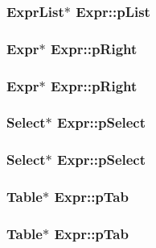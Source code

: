 \subsubsection{\setlength{\rightskip}{0pt plus 5cm}\bf{Expr\-List}$\ast$ \bf{Expr::p\-List}}\label{structExpr_8eb0b59798c61d147a051fbd93a0983c}


\subsubsection{\setlength{\rightskip}{0pt plus 5cm}\bf{Expr}$\ast$ \bf{Expr::p\-Right}}\label{structExpr_c7e7645d9ef0afe58cc8a7b254022cb1}


\subsubsection{\setlength{\rightskip}{0pt plus 5cm}\bf{Expr}$\ast$ \bf{Expr::p\-Right}}\label{structExpr_c7e7645d9ef0afe58cc8a7b254022cb1}


\subsubsection{\setlength{\rightskip}{0pt plus 5cm}\bf{Select}$\ast$ \bf{Expr::p\-Select}}\label{structExpr_bde9c8c63519c331518706bb4b11b657}


\subsubsection{\setlength{\rightskip}{0pt plus 5cm}\bf{Select}$\ast$ \bf{Expr::p\-Select}}\label{structExpr_bde9c8c63519c331518706bb4b11b657}


\subsubsection{\setlength{\rightskip}{0pt plus 5cm}\bf{Table}$\ast$ \bf{Expr::p\-Tab}}\label{structExpr_4e6d7c7177e231d5ccd0af7e8f8528c6}


\subsubsection{\setlength{\rightskip}{0pt plus 5cm}\bf{Table}$\ast$ \bf{Expr::p\-Tab}}\label{structExpr_4e6d7c7177e231d5ccd0af7e8f8528c6}


